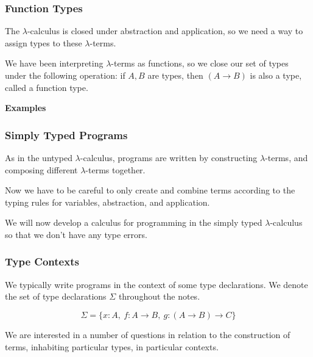 \documentclass{beamer}
\theoremstyle{indentDefn} \newtheorem{defn}[]{Definition}
\begin{document}
\begin{frame}
	\frametitle{Function Types}

  The $\lambda$-calculus is closed under abstraction and application, so we need a way to assign types to these $\lambda$-terms. 
  
  We have been interpreting $\lambda$-terms as functions, so we close our set of types under the following operation: if $A,B$ are types, then $(A\to B)$ is also a type, called a function type. 

  {\bf Examples}

  \vspace{4cm}





\end{frame}

\begin{frame}
  \frametitle{Simply Typed Programs}

  As in the untyped $\lambda$-calculus, programs are written by constructing $\lambda$-terms, and composing different $\lambda$-terms together. 
  
  Now we have to be careful to only create and combine terms according to the typing rules for variables, abstraction, and application. 

  We will now develop a calculus for programming in the simply typed $\lambda$-calculus so that we don't have any type errors. 


\end{frame}

\begin{frame}
  \frametitle{Type Contexts}

  We typically write programs in the context of some type declarations. We denote the set of type declarations $\Sigma$ throughout the notes. 

  $$\Sigma = \{x : A, \ f : A \to B, \ g : (A \to B) \to C\}$$

  We are interested in a number of questions in relation to the construction of terms, inhabiting particular types, in particular contexts. 

\end{frame}
\end{document}
